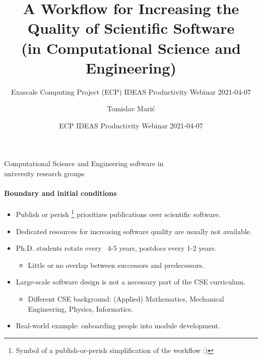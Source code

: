 \documentclass[
	aspectratio=169,%
	color={accentcolor=2d},
	logo=true,%
	colorframetitle=true,%
	]{tudabeamer}
\title{A Workflow for Increasing the Quality of Scientific Software\\ (in Computational Science and Engineering)}
\subtitle{Exascale Computing Project (ECP) IDEAS Productivity Webinar 2021-04-07}
\author[\textbf{T. Mari\'c}, JP. Lehr, I. Pappagianidis, B. Lambie, D. Bothe, C. Bischof]{Tomislav Mari\'c}
\institute{CRC 1194 : Z-INF}
\date{ECP IDEAS Productivity Webinar 2021-04-07}
\begin{document}
\maketitle

\begin{frame}{Computational Science and Engineering software in\\university research groups}
	\framesubtitle{Boundary and initial conditions}
	
	\vfill
	\begin{itemize}
            \item Publish or perish \faGraduationCap\footnote{Symbol of a publish-or-perish simplification of the workflow :)} prioritizes publications over scientific software.
		\item Dedicated resources for increasing software quality are usually not available.
		\item Ph.D. students rotate every ~4-5 years, postdocs every 1-2 years. 
			\begin{itemize}
				\item Little or no overlap between successors and predecessors. 
			\end{itemize}
		\item Large-scale software design is not a necessary part of the CSE curriculum. 
			\begin{itemize}
				\item Different CSE background: (Applied) Mathematics, Mechanical Engineering, Physics, Informatics.
			\end{itemize}
		\item Real-world example: onboarding people into \href{https://www.openfoam.com/documentation/guides/latest/api/classes.html}{} module development.
	\end{itemize}
\end{frame}
\end{document}
